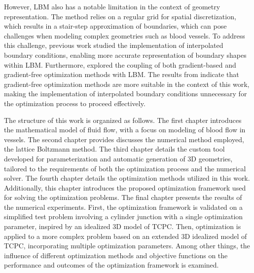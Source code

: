 However, LBM also has a notable limitation in the context of geometry representation. The method relies on a regular grid for spatial discretization, which results in a stair-step approximation of boundaries, which can pose challenges when modeling complex geometries such as blood vessels. To address this challenge, previous work \cite{buresBP, buresVU} studied the implementation of interpolated boundary conditions, enabling more accurate representation of boundary shapes within LBM. Furthermore, \cite{buresVU} explored the coupling of both gradient-based and gradient-free optimization methods with LBM. The results from \cite{buresVU} indicate that gradient-free optimization methods are more suitable in the context of this work, making the implementation of interpolated boundary conditions unnecessary for the optimization process to proceed effectively.

The structure of this work is organized as follows. The first chapter introduces the mathematical model of fluid flow, with a focus on modeling of blood flow in vessels. The second chapter provides discusses the numerical method employed, the lattice Boltzmann method. The third chapter details the custom tool developed for parameterization and automatic generation of 3D geometries, tailored to the requirements of both the optimization process and the numerical solver. The fourth chapter details the optimization methods utilized in this work. Additionally, this chapter introduces the proposed optimization framework used for solving the optimization problems. The final chapter presents the results of the numerical experiments. First, the optimization framework is validated on a simplified test problem involving a cylinder junction with a single optimization parameter, inspired by an idealized 3D model of TCPC. Then, optimization is applied to a more complex problem based on an extended 3D idealized model of TCPC, incorporating multiple optimization parameters. Among other things, the influence of different optimization methods and objective functions on the performance and outcomes of the optimization framework is examined.


